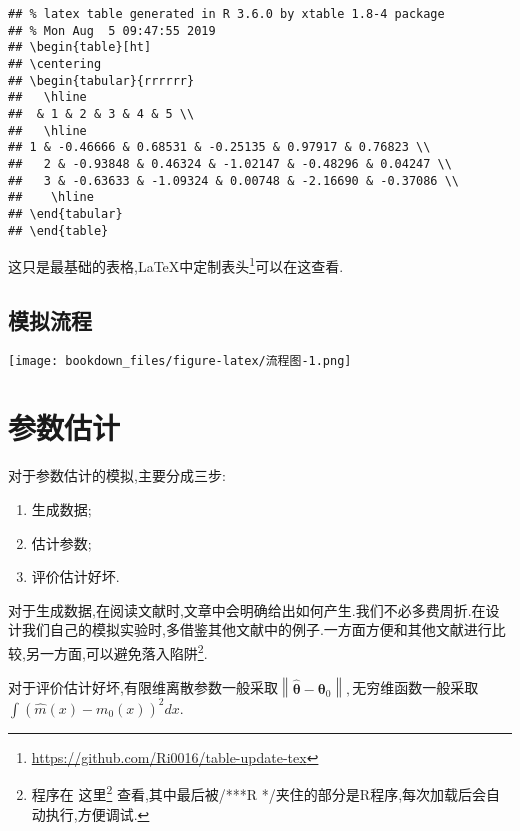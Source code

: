 \documentclass[]{ctexbook}
\providecommand{\tightlist}{%
  \setlength{\itemsep}{0pt}\setlength{\parskip}{0pt}}
\renewcommand{\href}[2]{#2\footnote{\url{#1}}}
\begin{document}
\begin{verbatim}
## % latex table generated in R 3.6.0 by xtable 1.8-4 package
## % Mon Aug  5 09:47:55 2019
## \begin{table}[ht]
## \centering
## \begin{tabular}{rrrrrr}
##   \hline
##  & 1 & 2 & 3 & 4 & 5 \\ 
##   \hline
## 1 & -0.46666 & 0.68531 & -0.25135 & 0.97917 & 0.76823 \\ 
##   2 & -0.93848 & 0.46324 & -1.02147 & -0.48296 & 0.04247 \\ 
##   3 & -0.63633 & -1.09324 & 0.00748 & -2.16690 & -0.37086 \\ 
##    \hline
## \end{tabular}
## \end{table}
\end{verbatim}

这只是最基础的表格,LaTeX中\href{https://github.com/Ri0016/table-update-tex}{定制表头}可以在这查看.

\hypertarget{section-8}{%
\section{模拟流程}\label{section-8}}

\texttt{[image: bookdown\_files/figure-latex/流程图-1.png]}

\hypertarget{section-9}{%
\chapter{参数估计}\label{section-9}}

对于参数估计的模拟,主要分成三步:

\begin{enumerate}
\def\labelenumi{\arabic{enumi}.}
\tightlist
\item
  生成数据;
\item
  估计参数;
\item
  评价估计好坏.
\end{enumerate}

对于生成数据,在阅读文献时,文章中会明确给出如何产生.我们不必多费周折.在设计我们自己的模拟实验时,多借鉴其他文献中的例子.一方面方便和其他文献进行比较,另一方面,可以避免落入陷阱\footnote{程序在 \href{\%22code/Rcpp-demo.cpp\%22}{这里} 查看,其中最后被/***R */夹住的部分是R程序,每次加载后会自动执行,方便调试.}.

对于评价估计好坏,有限维离散参数一般采取\(\left\|\hat{\boldsymbol{\theta}}-\boldsymbol{\theta}_{0}\right\|,\)无穷维函数一般采取\(\int\left(\hat{m}(x)-m_{0}(x)\right)^{2} d x.\)
\end{document}

